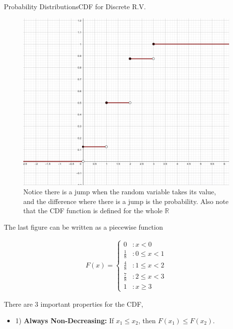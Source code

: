 \documentclass[8pt, usepdftitle = false]{beamer}
\begin{document}
\begin{frame}[allowframebreaks]{Probability Distributions}{CDF for Discrete R.V.}
\begin{itemize}
\framebreak

\begin{figure}
\includegraphics[scale = .3]{Images/CDF.png}
\caption{Notice there is a jump when the random variable takes its value, and the difference where there is a jump is the probability. Also note that the CDF function is defined for the whole $\mathbb{R}$}
\end{figure}

\framebreak

The last figure can be written as a piecewise function

\begin{align*}
F(x)= \begin{cases}0 & : x<0 \\ 
\frac{1}{8} & : 0 \leq x<1 \\ 
\frac{4}{8} & : 1 \leq x<2 \\ 
\frac{7}{8} & : 2 \leq x<3 \\ 
1 & : x \geq 3
\end{cases}
\end{align*}

\medskip

\framebreak

There are $3$ important properties for the CDF, 

\medskip
\begin{itemize}
\item 1) \textbf{Always Non-Decreasing:} If $x_1 \leq x_2$, then $F\left(x_1\right) \leq F\left(x_2\right)$. 


\end{itemize}
\end{itemize}
\end{frame}
\end{document}
